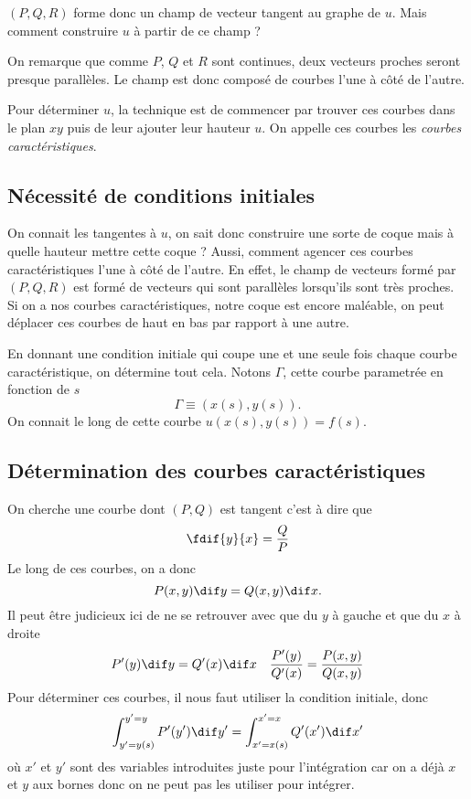 $(P, Q, R)$ forme donc un champ de vecteur tangent au graphe de $u$.
Mais comment construire $u$ à partir de ce champ ?

On remarque que comme $P$, $Q$ et $R$ sont continues, deux vecteurs proches
seront presque parallèles. Le champ est donc composé de courbes l'une à côté
de l'autre.

Pour déterminer $u$, la technique est de commencer par trouver ces courbes
dans le plan $xy$ puis de leur ajouter leur hauteur $u$.
On appelle ces courbes les \emph{courbes caractéristiques}.

\subsection{Nécessité de conditions initiales}
On connait les tangentes à $u$, on sait donc construire une
sorte de coque mais à quelle hauteur mettre cette coque ?
Aussi, comment agencer ces courbes caractéristiques l'une à côté de l'autre.
En effet, le champ de vecteurs formé par $(P, Q, R)$ est formé de vecteurs
qui sont parallèles lorsqu'ils sont très proches.
Si on a nos courbes caractéristiques, notre coque est encore maléable,
on peut déplacer ces courbes de haut en bas par rapport à une autre.

En donnant une condition initiale qui coupe une et une seule fois chaque
courbe caractéristique, on détermine tout cela.
Notons $\Gamma$, cette courbe parametrée en fonction de $s$
\[ \Gamma \equiv (x(s), y(s)). \]
On connait le long de cette courbe $u(x(s), y(s)) = f(s)$.

\subsection{Détermination des courbes caractéristiques}
On cherche une courbe dont $(P, Q)$ est tangent c'est à dire que
\[ \fdif{y}{x} = \frac{Q}{P} \]
Le long de ces courbes, on a donc
\[ P(x, y)\dif y = Q(x, y) \dif x. \]
Il peut être judicieux ici de ne se retrouver avec que du $y$ à gauche
et que du $x$ à droite
\begin{align*}
  P'(y) \dif y & = Q'(x) \dif x & \frac{P'(y)}{Q'(x)} = \frac{P(x,y)}{Q(x,y)}
\end{align*}
Pour déterminer ces courbes, il nous faut utiliser la condition initiale, donc
\[ \int_{y' = y(s)}^{y' = y} P'(y') \dif y'
= \int_{x' = x(s)}^{x' = x} Q'(x') \dif x' \]
où $x'$ et $y'$ sont des variables introduites juste pour l'intégration
car on a déjà $x$ et $y$ aux bornes donc on ne peut pas les utiliser pour
intégrer.

